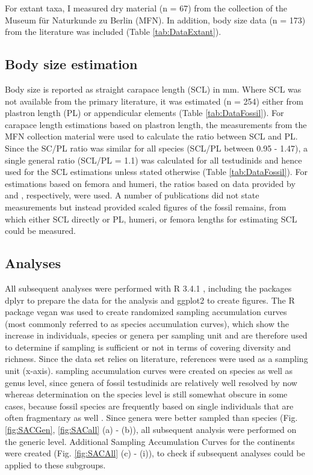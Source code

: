 For extant taxa, I measured dry material (n = 67) from the collection of the Museum für Naturkunde zu Berlin (MFN). In addition, body size data (n = 173) from the literature was included (Table \ref{tab:DataExtant}).

\subsection{Body size estimation}
Body size is reported as straight carapace length (SCL) in mm. Where SCL was not available from the primary literature, it was estimated (n = 254) either from plastron length (PL) or appendicular elements (Table \ref{tab:DataFossil}). For carapace length estimations based on plastron length, the measurements from the MFN collection material were used to calculate the ratio between SCL and PL. Since the SC/PL ratio was similar for all species (SCL/PL between 0.95 - 1.47), a single general ratio (SCL/PL = 1.1) was calculated for all testudinids and hence used for the SCL estimations unless stated otherwise (Table \ref{tab:DataFossil}). For estimations based on femora and humeri, the ratios based on data provided by \cite{Hutterer1998} and \cite{Franz2001a}, respectively, were used. A number of publications did not state measurements but instead provided scaled figures of the fossil remains, from which either SCL directly or PL, humeri, or femora lengths for estimating SCL could be measured.


\subsection{Analyses}
All subsequent analyses were performed with R 3.4.1 \citep{RCoreTeam2017}, including the packages dplyr \citep{Wickham2017} to prepare the data for the analysis and ggplot2 \citep{Wickham2009} to create figures. The R package vegan \citep{Oksanen2017} was used to create randomized sampling accumulation curves (most commonly referred to as species accumulation curves), which show the increase in individuals, species or genera per sampling unit and are therefore used to determine if sampling is sufficient or not in terms of covering diversity and richness. 
Since the data set relies on literature, references were used as a sampling unit (x-axis).%
sampling accumulation curves were created on species as well as genus level, since genera of fossil testudinids are relatively well resolved by now whereas determination on the species level is still somewhat obscure in some cases, because fossil species are frequently based on single individuals that are often fragmentary as well \citep{Brattstrom1961}. Since genera were better sampled than species (Fig. \ref{fig:SACGen}, \ref{fig:SACall} (a) - (b)), all subsequent analysis were performed on the generic level.
Additional Sampling Accumulation Curves for the continents were created (Fig. \ref{fig:SACAll} (c) -  (i)), to check if subsequent analyses could be applied to these subgroups. 

